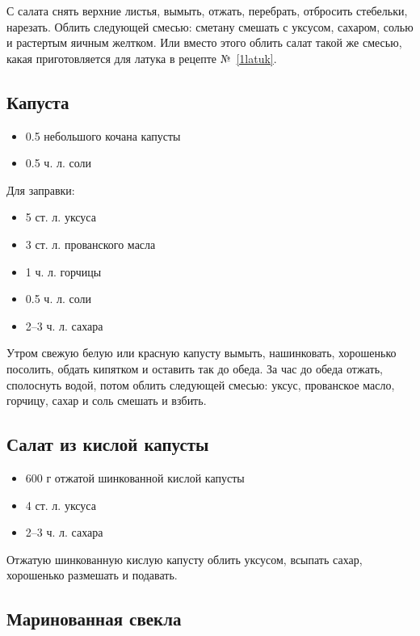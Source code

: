 С салата снять верхние листья, вымыть, отжать, перебрать, отбросить стебельки, нарезать. Облить следующей смесью: сметану смешать с уксусом, сахаром, солью и растертым яичным желтком. Или вместо этого облить салат такой же смесью, какая приготовляется для латука в рецепте №~\ref{1latuk}.

\subsection{Капуста}

\begin{itemize}
	\item 0.5 небольшого кочана капусты 
    \item 0.5 ч. л. соли
\end{itemize}

Для заправки: 

\begin{itemize}
	\item 5 ст. л. уксуса 
    \item 3 ст. л. прованского масла 
    \item 1 ч. л. горчицы 
    \item 0.5 ч. л. соли 
    \item 2–3 ч. л. сахара
\end{itemize}

Утром свежую белую или красную капусту вымыть, нашинковать, хорошенько посолить, обдать кипятком и оставить так до обеда. За час до обеда отжать, сполоснуть водой, потом облить следующей смесью: уксус, прованское масло, горчицу, сахар и соль смешать и взбить.

\subsection{Салат из кислой капусты}

\begin{itemize}
	\item 600 г отжатой шинкованной кислой капусты 
    \item 4 ст. л. уксуса 
    \item 2–3 ч. л. сахара
\end{itemize}

Отжатую шинкованную кислую капусту облить уксусом, всыпать сахар, хорошенько размешать и подавать.

\subsection{Маринованная свекла}

